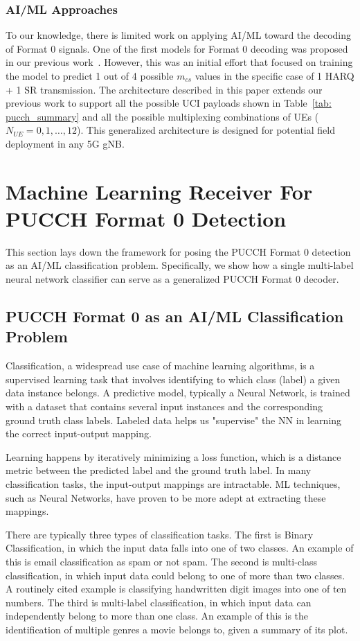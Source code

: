 \documentclass[journal]{IEEEtran}
\begin{document}
\subsubsection{AI/ML Approaches}
To our knowledge, there is limited work on applying AI/ML toward the decoding of Format 0 signals. One of the first models for Format 0 decoding was proposed in our previous work~\cite{yerrapragada2023machine}. However, this was an initial effort that focused on training the model to predict 1 out of 4 possible $m_{cs}$ values in the specific case of 1 HARQ + 1 SR transmission. The architecture described in this paper extends our previous work to support all the possible UCI payloads shown in Table~\ref{tab: pucch_summary} and all the possible multiplexing combinations of UEs ($N_{UE} = 0, 1, \dots, 12$). This generalized architecture is designed for potential field deployment in any 5G gNB.

\section{Machine Learning Receiver For PUCCH Format 0 Detection}
This section lays down the framework for posing the PUCCH Format 0 detection as an AI/ML classification problem. Specifically, we show how a single multi-label neural network classifier can serve as a generalized PUCCH Format 0 decoder. 

\subsection{PUCCH Format 0 as an AI/ML Classification Problem}
Classification, a widespread use case of machine learning algorithms, is a supervised learning task that involves identifying to which class (label) a given data instance belongs. A predictive model, typically a Neural Network, is trained with a dataset that contains several input instances and the corresponding ground truth class labels. Labeled data helps us "supervise" the NN in learning the correct input-output mapping. 

Learning happens by iteratively minimizing a loss function, which is a distance metric between the predicted label and the ground truth label. In many classification tasks, the input-output mappings are intractable. ML techniques, such as Neural Networks, have proven to be more adept at extracting these mappings. 

There are typically three types of classification tasks. The first is Binary Classification, in which the input data falls into one of two classes. An example of this is email classification as spam or not spam. The second is multi-class classification, in which input data could belong to one of more than two classes. A routinely cited example is classifying handwritten digit images into one of ten numbers. The third is multi-label classification, in which input data can independently belong to more than one class. An example of this is the identification of multiple genres a movie belongs to, given a summary of its plot. 
\end{document}

